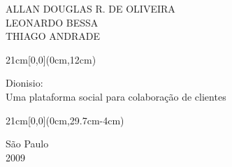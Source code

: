 \begin{center}
  {\large ALLAN DOUGLAS R. DE OLIVEIRA \\
    LEONARDO BESSA \\
    THIAGO ANDRADE}
\end{center}

\begin{textblock*}{21cm}[0,0](0cm,12cm)
  \begin{center}
    {\LARGE Dionisio:\\ Uma plataforma social para colaboração de clientes }
  \end{center}
\end{textblock*}


\begin{textblock*}{21cm}[0,0](0cm,29.7cm-4cm)
  \begin{center}
    {\large São Paulo \\ 2009 }
  \end{center}
\end{textblock*}



